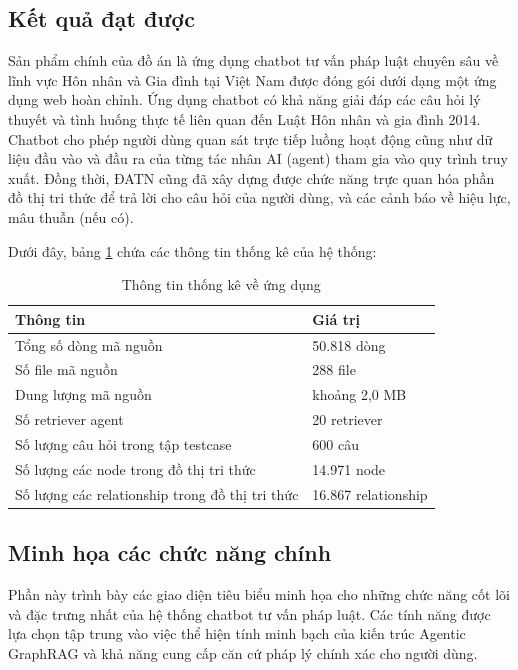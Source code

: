 \documentclass[../DoAn.tex]{subfiles}
\begin{document}
\subsection{Kết quả đạt được}
\label{subsection:4.7}
Sản phẩm chính của đồ án là ứng dụng chatbot tư vấn pháp luật chuyên sâu về lĩnh vực Hôn nhân và Gia đình tại Việt Nam được đóng gói dưới dạng một ứng dụng web hoàn chỉnh. Ứng dụng chatbot có khả năng giải đáp các câu hỏi lý thuyết và tình huống thực tế liên quan đến Luật Hôn nhân và gia đình 2014. Chatbot cho phép người dùng quan sát trực tiếp luồng hoạt động cũng như dữ liệu đầu vào và đầu ra của từng tác nhân AI (agent) tham gia vào quy trình truy xuất. Đồng thời, ĐATN cũng đã xây dựng được chức năng trực quan hóa phần đồ thị tri thức để trả lời cho câu hỏi của người dùng, và các cảnh báo về hiệu lực, mâu thuẫn (nếu có).

Dưới đây, bảng \ref{tab:summary_stats} chứa các thông tin thống kê của hệ thống:

\begin{table}[H]
\centering
\begin{tabular}{|l|l|}
\hline
\textbf{Thông tin} & \textbf{Giá trị} \\ \hline
Tổng số dòng mã nguồn & 50.818 dòng \\ \hline
Số file mã nguồn & 288 file \\ \hline
Dung lượng mã nguồn & khoảng 2,0 MB \\ \hline
Số retriever agent & 20 retriever \\ \hline
Số lượng câu hỏi trong tập testcase & 600 câu \\ \hline
Số lượng các node trong đồ thị tri thức & 14.971 node \\ \hline
Số lượng các relationship trong đồ thị tri thức & 16.867 relationship \\ \hline
\end{tabular}
\caption{Thông tin thống kê về ứng dụng}
\label{tab:summary_stats}
\end{table}

\subsection{Minh họa các chức năng chính}
\label{subsection:4.8}

Phần này trình bày các giao diện tiêu biểu minh họa cho những chức năng cốt lõi và đặc trưng nhất của hệ thống chatbot tư vấn pháp luật. Các tính năng được lựa chọn tập trung vào việc thể hiện tính minh bạch của kiến trúc Agentic GraphRAG và khả năng cung cấp căn cứ pháp lý chính xác cho người dùng.
\end{document}
